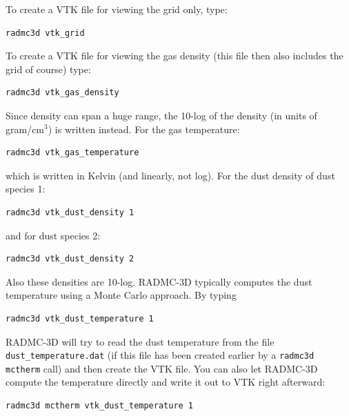 \documentclass{report}
\newenvironment{asciibox}%
  {\begin{list}{}{%
    \setlength{\topsep}{0.5em}%
    \setlength{\parskip}{0em}%
    \setlength{\parsep}{0em}%
    \setlength{\itemsep}{0em}%
    \setlength{\rightmargin}{0em}%
    \setlength{\leftmargin}{3.0em}%
    \setlength{\labelsep}{1em}%
    \setlength{\labelwidth}{2em}%
  }\normalfont\footnotesize\item}
  {\end{list}}
\begin{document}
To create a VTK file for viewing the grid only, type:
\begin{asciibox}\begin{verbatim}
radmc3d vtk_grid
\end{verbatim}\end{asciibox}
To create a VTK file for viewing the gas density (this file then also
includes the grid of course) type:
\begin{asciibox}\begin{verbatim}
radmc3d vtk_gas_density
\end{verbatim}\end{asciibox}
Since density can span a huge range, the 10-log of the density (in units of
gram/cm$^3$) is written instead. For the gas temperature:
\begin{asciibox}\begin{verbatim}
radmc3d vtk_gas_temperature
\end{verbatim}\end{asciibox}
which is written in Kelvin (and linearly, not log). For the dust density of
dust species 1:
\begin{asciibox}\begin{verbatim}
radmc3d vtk_dust_density 1
\end{verbatim}\end{asciibox}
and for dust species 2:
\begin{asciibox}\begin{verbatim}
radmc3d vtk_dust_density 2
\end{verbatim}\end{asciibox}
Also these densities are 10-log. RADMC-3D typically computes the dust
temperature using a Monte Carlo approach. By typing
\begin{asciibox}\begin{verbatim}
radmc3d vtk_dust_temperature 1
\end{verbatim}\end{asciibox}
RADMC-3D will try to read the dust temperature from the file
{\small\tt dust\_temperature.dat} (if this file has been created 
earlier by a {\small\tt radmc3d mctherm} call) and then create
the VTK file. You can also let RADMC-3D compute the temperature
directly and write it out to VTK right afterward:
\begin{asciibox}\begin{verbatim}
radmc3d mctherm vtk_dust_temperature 1
\end{verbatim}\end{asciibox}
\end{document}
